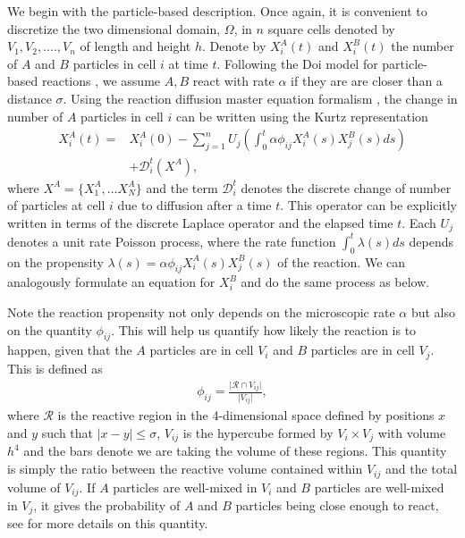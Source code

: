 \documentclass[10pt,twocolumn]{revtex4-1}
\begin{document}
	We begin with the particle-based description. Once again, it is convenient to discretize the two dimensional domain, $\Omega$, in $n$ square cells denoted by $V_{1},V_{2},....,V_{n}$ of length and height $h$. Denote by $X^{A}_{i}(t)$ and $X_{i}^{B}(t)$ the number of $A$ and $B$ particles in cell $i$ at time $t$. Following the Doi model for particle-based reactions \cite{doi1976stochastic, hoffmann2019readdy}, we assume $A,B$ react with rate $\alpha$ if they are are closer than a distance $\sigma$. Using the reaction diffusion master equation formalism \cite{isaacson2013convergent}, the change in number of $A$ particles in cell $i$ can be written using the Kurtz representation \cite{anderson2015stochastic}
	\begin{align}
	X^A_i(t) =& X^A_i(0) - \sum^n_{j=1} 
	U_j\left( \int_0^t \alpha \phi_{ij} X^A_i(s) X_j^B(s) ds \right) \nonumber \\
	&+ \mathcal{D}_i^t(X^A),
	\label{eq:numAtraj}
	\end{align}
	where $X^A=\{X_1^A,\dots X_N^A\}$ and the term $\mathcal{D}_i^t$ denotes the discrete change of number of particles at cell $i$ due to diffusion after a time $t$. This operator can be explicitly written in terms of the discrete Laplace operator and the elapsed time $t$. Each $U_j$ denotes a unit rate Poisson process, where the rate function $\int_0^t \lambda (s)ds$ depends on the propensity $\lambda (s) = \alpha \phi_{ij} X^A_i(s) X_j^B(s)$ of the reaction. We can analogously formulate an equation for $X_{i}^{B}$ and do the same process as below. 
	
	Note the reaction propensity not only depends on the microscopic rate $\alpha$ but also on the quantity $\phi_{ij}$. This will help us quantify how likely the reaction is to happen, given that the $A$ particles are in cell $V_i$ and $B$ particles are in cell $V_j$. This is defined as
	\begin{align} 
	\phi_{ij}= \frac{\vert \mathcal{R}\cap V_{ij} \vert}{\vert V_{ij} \vert},
	\label{eq:defPhiij}
	\end{align}
	where $\mathcal{R}$ is the reactive region in the 4-dimensional space defined by positions $x$ and $y$ such that $|x-y|\leq \sigma$, $V_{ij}$ is the hypercube formed by $V_i \times V_j$ with volume $h^4$ and the bars denote we are taking the volume of these regions. This quantity is simply the ratio between the reactive volume contained within $V_{ij}$ and the total volume of $V_{ij}$. If $A$ particles are well-mixed in $V_{i}$ and $B$ particles are well-mixed in $V_{j}$, it gives the probability of $A$ and $B$ particles being close enough to react, see \cite{isaacson2013convergent} for more details on this quantity.
	
\end{document}
